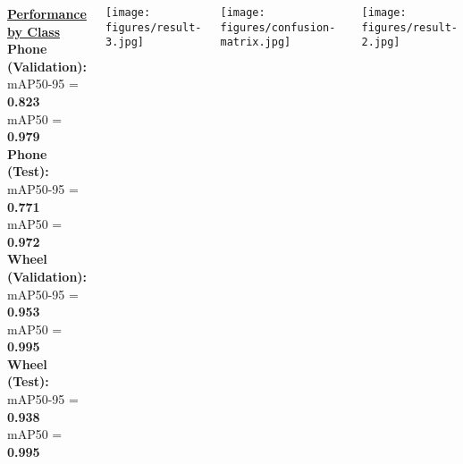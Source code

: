 \documentclass[
    15pt,
    margin=0.25in,
    innermargin=0.25in,
]{tikzposter}
\begin{document}
\begin{columns}
{\begin{minipage}[t]{0.32\linewidth}
\end{minipage}%
\hfill
\begin{minipage}[t]{0.32\linewidth}\vspace{0pt}
\raggedright
\underline{\textbf{Performance by Class}} \\[0.3em]

\textbf{Phone (Validation):} \\
mAP50-95 = \textbf{0.823} \\
mAP50 = \textbf{0.979} \\[0.3em]

\textbf{Phone (Test):} \\
mAP50-95 = \textbf{0.771} \\
mAP50 = \textbf{0.972} \\[0.3em]

\textbf{Wheel (Validation):} \\
mAP50-95 = \textbf{0.953} \\
mAP50 = \textbf{0.995} \\[0.3em]

\textbf{Wheel (Test):} \\
mAP50-95 = \textbf{0.938} \\
mAP50 = \textbf{0.995}
\end{minipage}%
\hfill
\begin{minipage}[t]{0.32\linewidth}\vspace{0pt}
\centering
\texttt{[image: figures/result-3.jpg]}
\vspace{0.3em}
\captionsetup{type=figure,aboveskip=2pt,belowskip=2pt}


\texttt{[image: figures/confusion-matrix.jpg]}
\captionsetup{type=figure,aboveskip=2pt,belowskip=2pt}
\end{minipage}

\vspace{0.5em}

{\centering
\texttt{[image: figures/result-2.jpg]}\par
\captionsetup{type=figure,aboveskip=2pt,belowskip=2pt}
}
}



\end{columns}
\end{document}
